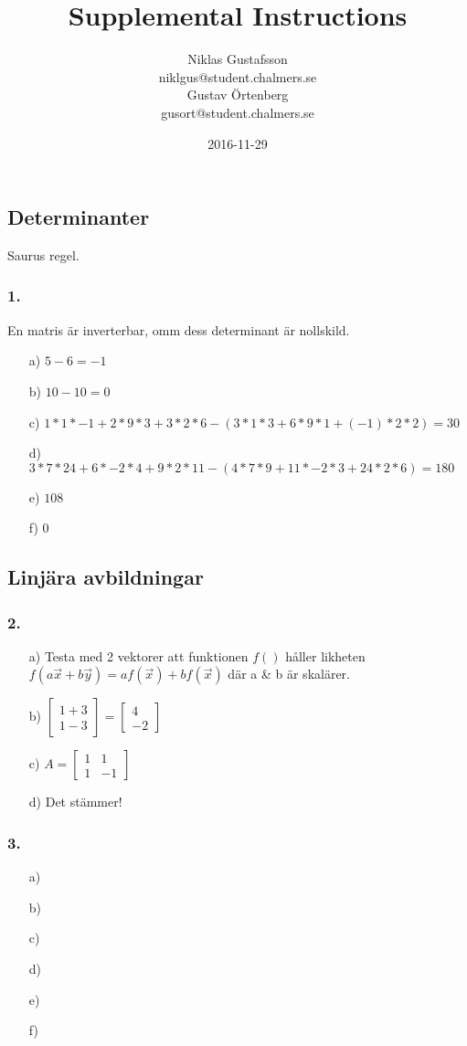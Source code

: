 \documentclass{article}
\title{Supplemental Instructions}
\author{Niklas Gustafsson \\ 
		\small{niklgus@student.chalmers.se} \\
		Gustav Örtenberg \\ 
		\small{gusort@student.chalmers.se}
}
\date{
      2016-11-29
     }
\begin{document}
\maketitle

\subsection*{Determinanter}
Saurus regel.
\subsubsection*{1.}
En matris är inverterbar, omm dess determinant är nollskild.
\begin{itemize}
	\item[a) ] $5-6=-1$
	\item[b) ] $10-10=0$
	\item[c) ] $1*1*-1+2*9*3+3*2*6-(3*1*3+6*9*1+(-1)*2*2)=30$
	\item[d) ] $3*7*24+6*-2*4+9*2*11-(4*7*9+11*-2*3+24*2*6)=180$
	\item[e) ] $108 $
	\item[f) ] $0 $
\end{itemize}

\subsection*{Linjära avbildningar}
\subsubsection*{2.}
\begin{itemize}
	\item[a) ] Testa med 2 vektorer att funktionen $f()$ håller likheten $f(a\vec{x}+b\vec{y})=af(\vec{x})+bf(\vec{x})$ där a & b är skalärer.
	\item[b) ] $\begin{bmatrix}1+3\\1-3\end{bmatrix}=\begin{bmatrix}4\\-2\end{bmatrix}$
	\item[c) ] $A=\begin{bmatrix}1&1\\1&-1\end{bmatrix}$
	\item[d) ] Det stämmer!
\end{itemize}

\subsubsection*{3.}
\begin{itemize} 
	\item[a) ] 
	\item[b) ]  
	\item[c) ]  
	\item[d) ] 
	\item[e) ] 
	\item[f) ] 
\end{itemize}
\end{document}
